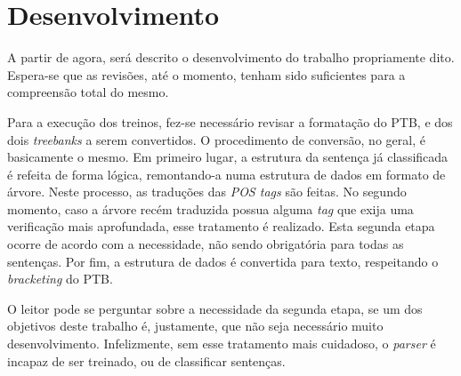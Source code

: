 \chapter{Desenvolvimento}
\label{cap:desenv}

A partir de agora, será descrito o desenvolvimento do trabalho propriamente dito. Espera-se que as revisões, até o momento, tenham sido suficientes para a compreensão total do mesmo.

Para a execução dos treinos, fez-se necessário revisar a formatação do PTB, e dos dois \textit{treebanks} a serem convertidos. O procedimento de conversão, no geral, é basicamente o mesmo. Em primeiro lugar, a estrutura da sentença já classificada é refeita de forma lógica, remontando-a numa estrutura de dados em formato de árvore. Neste processo, as traduções das \textit{POS tags} são feitas. No segundo momento, caso a árvore recém traduzida possua alguma \textit{tag} que exija uma verificação mais aprofundada, esse tratamento é realizado. Esta segunda etapa ocorre de acordo com a necessidade, não sendo obrigatória para todas as sentenças. Por fim, a estrutura de dados é convertida para texto, respeitando o \textit{bracketing} do PTB.

O leitor pode se perguntar sobre a necessidade da segunda etapa, se um dos objetivos deste trabalho é, justamente, que não seja necessário muito desenvolvimento. Infelizmente, sem esse tratamento mais cuidadoso, o \textit{parser} é incapaz de ser treinado, ou de classificar sentenças. 






